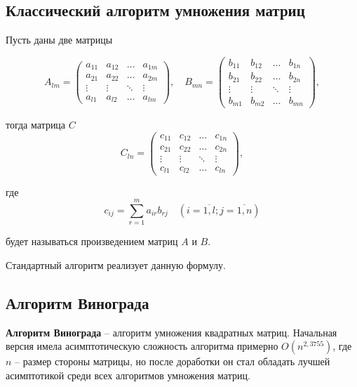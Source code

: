 \subsection{Классический алгоритм умножения матриц}

Пусть даны две матрицы

\begin{equation}
	A_{lm} = \begin{pmatrix}
		a_{11} & a_{12} & \ldots & a_{1m}\\
		a_{21} & a_{22} & \ldots & a_{2m}\\
		\vdots & \vdots & \ddots & \vdots\\
		a_{l1} & a_{l2} & \ldots & a_{lm}
	\end{pmatrix},
	\quad
	B_{mn} = \begin{pmatrix}
		b_{11} & b_{12} & \ldots & b_{1n}\\
		b_{21} & b_{22} & \ldots & b_{2n}\\
		\vdots & \vdots & \ddots & \vdots\\
		b_{m1} & b_{m2} & \ldots & b_{mn}
	\end{pmatrix},
\end{equation}

тогда матрица $C$
\begin{equation}
	C_{ln} = \begin{pmatrix}
		c_{11} & c_{12} & \ldots & c_{1n}\\
		c_{21} & c_{22} & \ldots & c_{2n}\\
		\vdots & \vdots & \ddots & \vdots\\
		c_{l1} & c_{l2} & \ldots & c_{ln}
	\end{pmatrix},
\end{equation}

где
\begin{equation}
	\label{eq:M}
	c_{ij} =
	\sum_{r=1}^{m} a_{ir}b_{rj} \quad (i=\overline{1,l}; j=\overline{1,n})
\end{equation}

будет называться произведением матриц $A$ и $B$.

Стандартный алгоритм  реализует данную формулу.


\subsection{Алгоритм Винограда}

\textbf{Алгоритм Винограда}  -- алгоритм умножения квадратных матриц. Начальная версия имела асимптотическую сложность алгоритма примерно $O(n^{2,3755})$, где $n$ -- размер стороны матрицы, но после доработки он стал обладать лучшей асимптотикой среди всех алгоритмов умножения матриц.

